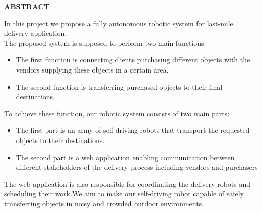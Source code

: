 \begin{titlepage}

\begin{center}
    \Large
    \vspace{0.9cm}
    \textbf{ABSTRACT}
    \end{center}
\hspace{2cm} In this project we propose a fully autonomous robotic system for last-mile delivery application.\\
     The proposed system is supposed to perform two main functions:
     \begin{itemize}
         \item The first function is connecting clients purchasing different objects with the vendors supplying these objects in a certain area.
         \item The second function is transferring purchased objects to their final destinations.
         
     \end{itemize}{}
     
     To achieve these function, our robotic system consists of two main parts:
     \begin{itemize}
         \item The first part is an army of self-driving robots that transport the requested objects to their destinations.
         \item The second part is a web application enabling communication between different stakeholders of the delivery process including vendors and purchasers
     \end{itemize}{}
     The web application is also responsible for coordinating the delivery robots and scheduling their work.We aim to make our self-driving robot capable of safely transferring objects in noisy and crowded outdoor environments.
\end{titlepage}

